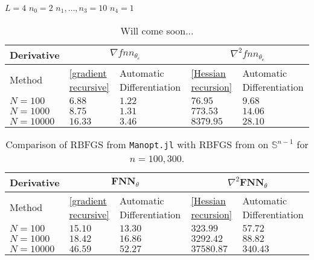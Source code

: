 $L = 4$ $n_0 = 2$ $n_1, \ldots, n_3 = 10$ $n_4 = 1$
\begin{table}[H]\label{tab:advs ecplicit: fnn}
    \resizebox{\textwidth}{!}
    {
        \begin{tabular}{l l l l l }
            \toprule
            Derivative & \multicolumn{2}{c}{$\nabla fnn_{\theta_e}$}& \multicolumn{2}{c}{$\nabla^2 fnn_{\theta_e}$} \\ 
            \midrule
            Method & \cref{gradient recursive} & Automatic Differentiation & \cref{Hessian recursion} & Automatic Differentiation \\ 
            \midrule
            $N = 100$ & $6.88$ & $1.22$ & $76.95$ & $9.68$ \\ 
            \midrule
            $N = 1000$ & $8.75$ & $1.31$ & $773.53$ & $14.06$ \\ 
            \midrule
            $N = 10000$ & $16.33$ & $3.46$ & $8379.95$ & $28.10$ \\ 
            \bottomrule
        \end{tabular}
    }
    \caption{Will come soon...}
\end{table}

\begin{table}[H]\label{tab:advs ecplicit: FNN}
    \resizebox{\textwidth}{!}
    {
        \begin{tabular}{l l l l l }
            \toprule
            Derivative & \multicolumn{2}{c}{$ \mathbf{FNN}_{\theta}$}& \multicolumn{2}{c}{$\nabla^2 \mathbf{FNN}_{\theta}$} \\ 
            \midrule
            Method & \cref{gradient recursive} & Automatic Differentiation & \cref{Hessian recursion} & Automatic Differentiation \\ 
            \midrule
            $N = 100$ & $15.10$ & $13.30$ & $323.99$ & $57.72$ \\ 
            \midrule
            $N = 1000$ & $18.42$ & $16.86$ & $3292.42$ & $88.82$ \\ 
            \midrule
            $N = 10000$ & $46.59$ & $52.27$ & $37580.87$ & $340.43$ \\ 
            \bottomrule
        \end{tabular}
    }
    \caption{Comparison of RBFGS from \lstinline!Manopt.jl! with RBFGS from \cite{Qi:2011} on $\mathbb{S}^{n-1}$ for $n=100,300$.}
\end{table}




